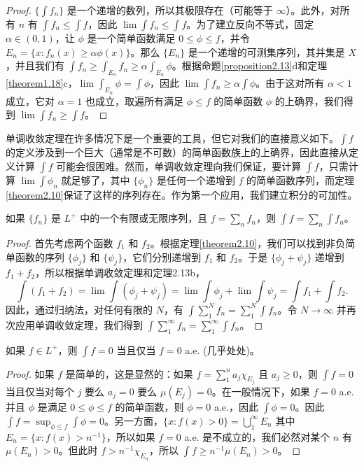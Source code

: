 \documentclass[lang=cn,10pt,thmcnt=section]{elegantbook}
\begin{document}
\begin{proof}
$\{\int f_n\}$ 是一个递增的数列，所以其极限存在（可能等于 $\infty$）。此外，对所有 $n$ 有 $\int f_n \leq \int f$，因此 $\lim \int f_n \leq \int f$。为了建立反向不等式，固定 $\alpha \in (0,1)$，让 $\phi$ 是一个简单函数满足 $0 \leq \phi \leq f$，并令 $E_n = \{x : f_n(x) \geq \alpha\phi(x)\}$。那么 $\{E_n\}$ 是一个递增的可测集序列，其并集是 $X$，并且我们有 $\int f_n \geq \int_{E_n} f_n \geq \alpha \int_{E_n} \phi$。根据命题\ref{proposition2.13}d和定理\ref{theorem1.18}c，$\lim \int_{E_n} \phi = \int \phi$，因此 $\lim \int f_n \geq \alpha \int \phi$。由于这对所有 $\alpha < 1$ 成立，它对 $\alpha = 1$ 也成立，取遍所有满足 $\phi \leq f$ 的简单函数 $\phi$ 的上确界，我们得到 $\lim \int f_n \geq \int f$。
\end{proof}


单调收敛定理在许多情况下是一个重要的工具，但它对我们的直接意义如下。$\int f$ 的定义涉及到一个巨大（通常是不可数）的简单函数族上的上确界，因此直接从定义计算 $\int f$ 可能会很困难。然而，单调收敛定理向我们保证，要计算 $\int f$，只需计算 $\lim \int \phi_n$ 就足够了，其中 $\{\phi_n\}$ 是任何一个递增到 $f$ 的简单函数序列，而定理\ref{theorem2.10}保证了这样的序列存在。作为第一个应用，我们建立积分的可加性。

\begin{theorem}\label{theorem2.15}
如果 $\{f_n\}$ 是 $L^+$ 中的一个有限或无限序列，且 $f = \sum_n f_n$，则 $\int f = \sum_n \int f_n$。
\end{theorem}

\begin{proof}
首先考虑两个函数 $f_1$ 和 $f_2$。根据定理\ref{theorem2.10}，我们可以找到非负简单函数的序列 $\{\phi_j\}$ 和 $\{\psi_j\}$，它们分别递增到 $f_1$ 和 $f_2$。于是 $\{\phi_j + \psi_j\}$ 递增到 $f_1 + f_2$，所以根据单调收敛定理和定理2.13b，
\[ \int (f_1 + f_2) = \lim \int(\phi_j + \psi_j) = \lim \int \phi_j + \lim \int \psi_j = \int f_1 + \int f_2. \]
因此，通过归纳法，对任何有限的 $N$，有 $\int \sum_1^N f_n = \sum_1^N \int f_n$。令 $N \to \infty$ 并再次应用单调收敛定理，我们得到 $\int \sum_1^\infty f_n = \sum_1^\infty \int f_n$。
\end{proof}

\begin{proposition}\label{proposition2.16}
如果 $f \in L^+$，则 $\int f = 0$ 当且仅当 $f = 0$ a.e. (几乎处处)。
\end{proposition}

\begin{proof}
如果 $f$ 是简单的，这是显然的：如果 $f = \sum_1^n a_j \chi_{E_j}$ 且 $a_j \ge 0$，则 $\int f = 0$ 当且仅当对每个 $j$ 要么 $a_j=0$ 要么 $\mu(E_j)=0$。在一般情况下，如果 $f=0$ a.e. 并且 $\phi$ 是满足 $0 \le \phi \le f$ 的简单函数，则 $\phi=0$ a.e.，因此 $\int \phi = 0$。因此 $\int f = \sup_{\phi \le f} \int \phi = 0$。另一方面，$\{x: f(x)>0\} = \bigcup_1^\infty E_n$ 其中 $E_n = \{x: f(x) > n^{-1}\}$，所以如果 $f=0$ a.e. 是不成立的，我们必然对某个 $n$ 有 $\mu(E_n)>0$。但此时 $f > n^{-1}\chi_{E_n}$，所以 $\int f \ge n^{-1}\mu(E_n) > 0$。
\end{proof}
\end{document}
